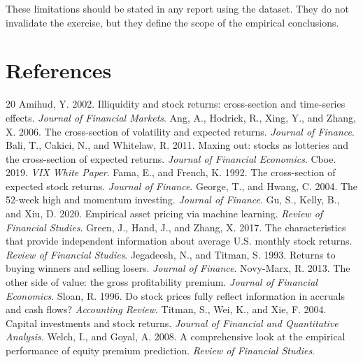 \documentclass[11pt,a4paper]{article}
\begin{document}
These limitations should be stated in any report using the dataset. They do not invalidate the exercise, but they define the scope of the empirical conclusions.

\section{References}

\begin{thebibliography}{20}
 Amihud, Y. 2002. Illiquidity and stock returns: cross-section and time-series effects. \textit{Journal of Financial Markets}.
 Ang, A., Hodrick, R., Xing, Y., and Zhang, X. 2006. The cross-section of volatility and expected returns. \textit{Journal of Finance}.
 Bali, T., Cakici, N., and Whitelaw, R. 2011. Maxing out: stocks as lotteries and the cross-section of expected returns. \textit{Journal of Financial Economics}.
 Cboe. 2019. \textit{VIX White Paper}.
 Fama, E., and French, K. 1992. The cross-section of expected stock returns. \textit{Journal of Finance}.
 George, T., and Hwang, C. 2004. The 52-week high and momentum investing. \textit{Journal of Finance}.
 Gu, S., Kelly, B., and Xiu, D. 2020. Empirical asset pricing via machine learning. \textit{Review of Financial Studies}.
 Green, J., Hand, J., and Zhang, X. 2017. The characteristics that provide independent information about average U.S. monthly stock returns. \textit{Review of Financial Studies}.
 Jegadeesh, N., and Titman, S. 1993. Returns to buying winners and selling losers. \textit{Journal of Finance}.
 Novy-Marx, R. 2013. The other side of value: the gross profitability premium. \textit{Journal of Financial Economics}.
 Sloan, R. 1996. Do stock prices fully reflect information in accruals and cash flows? \textit{Accounting Review}.
 Titman, S., Wei, K., and Xie, F. 2004. Capital investments and stock returns. \textit{Journal of Financial and Quantitative Analysis}.
 Welch, I., and Goyal, A. 2008. A comprehensive look at the empirical performance of equity premium prediction. \textit{Review of Financial Studies}.
\end{thebibliography}
\end{document}
